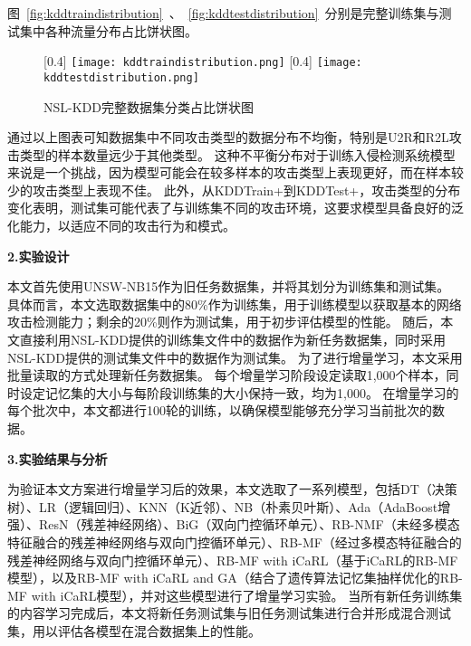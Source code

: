 图~\ref{fig:kddtraindistribution}~、~\ref{fig:kddtestdistribution}~分别是完整训练集与测试集中各种流量分布占比饼状图。
\begin{figure}[htbp]
	\centering
	[0.4\textwidth]{
		\texttt{[image: kddtraindistribution.png]}
	}
	\hspace{36pt}
	[0.4\textwidth]{
		\texttt{[image: kddtestdistribution.png]}
	}
	\caption{NSL-KDD完整数据集分类占比饼状图}
\end{figure}

通过以上图表可知数据集中不同攻击类型的数据分布不均衡，特别是U2R和R2L攻击类型的样本数量远少于其他类型。
这种不平衡分布对于训练入侵检测系统模型来说是一个挑战，因为模型可能会在较多样本的攻击类型上表现更好，而在样本较少的攻击类型上表现不佳。
此外，从KDDTrain+到KDDTest+，攻击类型的分布变化表明，测试集可能代表了与训练集不同的攻击环境，这要求模型具备良好的泛化能力，以适应不同的攻击行为和模式。\par

\textbf{2.实验设计}\par
本文首先使用UNSW-NB15作为旧任务数据集，并将其划分为训练集和测试集。
具体而言，本文选取数据集中的80\%作为训练集，用于训练模型以获取基本的网络攻击检测能力；剩余的20\%则作为测试集，用于初步评估模型的性能。
随后，本文直接利用NSL-KDD提供的训练集文件中的数据作为新任务数据集，同时采用NSL-KDD提供的测试集文件中的数据作为测试集。
为了进行增量学习，本文采用批量读取的方式处理新任务数据集。
每个增量学习阶段设定读取1,000个样本，同时设定记忆集的大小与每阶段训练集的大小保持一致，均为1,000。
在增量学习的每个批次中，本文都进行100轮的训练，以确保模型能够充分学习当前批次的数据。\par

\textbf{3.实验结果与分析}\par
为验证本文方案进行增量学习后的效果，本文选取了一系列模型，包括DT（决策树）、LR（逻辑回归）、KNN（K近邻）、NB（朴素贝叶斯）、Ada（AdaBoost增强）、ResN（残差神经网络）、BiG（双向门控循环单元）、RB-NMF（未经多模态特征融合的残差神经网络与双向门控循环单元）、RB-MF（经过多模态特征融合的残差神经网络与双向门控循环单元）、RB-MF with iCaRL（基于iCaRL的RB-MF模型），以及RB-MF with iCaRL and GA（结合了遗传算法记忆集抽样优化的RB-MF with iCaRL模型），并对这些模型进行了增量学习实验。
当所有新任务训练集的内容学习完成后，本文将新任务测试集与旧任务测试集进行合并形成混合测试集，用以评估各模型在混合数据集上的性能。\par

